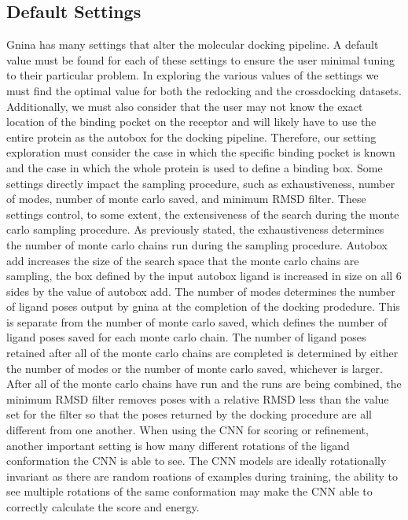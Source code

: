 \documentclass[journal=jcisd8,manuscript=article]{achemso}
\begin{document}
\subsection{Default Settings}
Gnina has many settings that alter the molecular docking pipeline. A default value must be found for each of these settings to ensure the user minimal tuning to their particular problem. In exploring the various values of the settings we must find the optimal value for both the redocking and the crossdocking datasets. Additionally, we must also consider that the user may not know the exact location of the binding pocket on the receptor and will likely have to use the entire protein as the autobox for the docking pipeline. Therefore, our setting exploration must consider the case in which the specific binding pocket is known and the case in which the whole protein is used to define a binding box. Some settings directly impact the sampling procedure, such as exhaustiveness, number of modes, number of monte carlo saved, and minimum RMSD filter. These settings control, to some extent, the extensiveness of the search during the monte carlo sampling procedure. As previously stated, the exhaustiveness determines the number of monte carlo chains run during the sampling procedure. Autobox add increases the size of the search space that the monte carlo chains are sampling, the box defined by the input autobox ligand is increased in size on all 6 sides by the value of autobox add. The number of modes determines the number of ligand poses output by gnina at the completion of the docking prodedure. This is separate from the number of monte carlo saved, which defines the number of  ligand poses saved for each monte carlo chain. The number of ligand poses retained after all of the monte carlo chains are completed is determined by either the number of modes or the number of monte carlo saved, whichever is larger. After all of the monte carlo chains have run and the runs are being combined, the minimum RMSD filter removes poses with a relative RMSD less than the value set for the filter so that the poses returned by the docking procedure are all different from one another. When using the CNN for scoring or refinement, another important setting is how many different rotations of the ligand conformation the CNN is able to see. The CNN models are ideally rotationally invariant as there are random roations of examples during training, the ability to see multiple rotations of the same conformation may make the CNN able to correctly calculate the score and energy.
\end{document}
